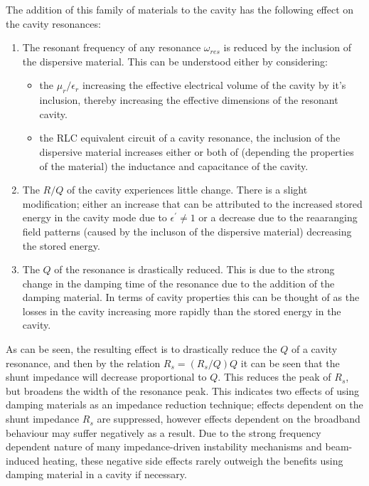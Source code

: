 The addition of this family of materials to the cavity has the following effect on the cavity resonances:

\begin{enumerate}
\item{The resonant frequency of any resonance $\omega_{res}$ is reduced by the inclusion of the dispersive material. This can be understood either by considering:}
\begin{itemize}
\item{the $\mu_{r} / \epsilon_{r}$ increasing the effective electrical volume of the cavity by it's inclusion, thereby increasing the effective dimensions of the resonant cavity.}
\item{the RLC equivalent circuit of a cavity resonance, the inclusion of the dispersive material increases either or both of (depending the properties of the material) the inductance and capacitance of the cavity.}
\end{itemize}
\item{The $R/Q$ of the cavity experiences little change. There is a slight modification; either an increase that can be attributed to the increased stored energy in the cavity mode due to $\epsilon^{'} \neq 1$ or a decrease due to the reaaranging field patterns (caused by the incluson of the dispersive material) decreasing the stored energy.}
\item{The $Q$ of the resonance is drastically reduced. This is due to the strong change in the damping time of the resonance due to the addition of the damping material. In terms of cavity properties this can be thought of as the losses in the cavity increasing more rapidly than the stored energy in the cavity.}
\end{enumerate} 

As can be seen, the resulting effect is to drastically reduce the $Q$ of a cavity resonance, and then by the relation $R_{s} = (R_{s}/Q) Q$ it can be seen that the shunt impedance will decrease proportional to $Q$. This reduces the peak of $R_{s}$, but broadens the width of the resonance peak. This indicates two effects of using damping materials as an impedance reduction technique; effects dependent on the shunt impedance $R_{s}$ are suppressed, however effects dependent on the broadband behaviour may suffer negatively as a result. Due to the strong frequency dependent nature of many impedance-driven instability mechanisms and beam-induced heating, these negative side effects rarely outweigh the benefits using damping material in a cavity if necessary.

